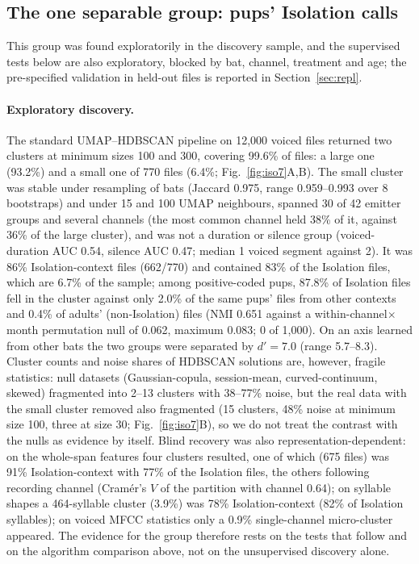 \subsection{The one separable group: pups' Isolation calls}\label{sec:iso}
This group was found exploratorily in the discovery sample, and the supervised tests below are also exploratory, blocked by bat, channel, treatment and age; the pre-specified validation in held-out files is reported in Section~\ref{sec:repl}.

\paragraph{Exploratory discovery.} The standard UMAP--HDBSCAN pipeline on 12,000 voiced files returned two clusters at minimum sizes 100 and 300, covering 99.6\% of files: a large one (93.2\%) and a small one of 770 files (6.4\%; Fig.~\ref{fig:iso7}A,B). The small cluster was stable under resampling of bats (Jaccard 0.975, range 0.959--0.993 over 8 bootstraps) and under 15 and 100 UMAP neighbours, spanned 30 of 42 emitter groups and several channels (the most common channel held 38\% of it, against 36\% of the large cluster), and was not a duration or silence group (voiced-duration AUC 0.54, silence AUC 0.47; median 1 voiced segment against 2). It was 86\% Isolation-context files (662/770) and contained 83\% of the Isolation files, which are 6.7\% of the sample; among positive-coded pups, 87.8\% of Isolation files fell in the cluster against only 2.0\% of the same pups' files from other contexts and 0.4\% of adults' (non-Isolation) files (NMI 0.651 against a within-channel$\times$month permutation null of 0.062, maximum 0.083; 0 of 1,000). On an axis learned from other bats the two groups were separated by $d'=7.0$ (range 5.7--8.3). Cluster counts and noise shares of HDBSCAN solutions are, however, fragile statistics: null datasets (Gaussian-copula, session-mean, curved-continuum, skewed) fragmented into 2--13 clusters with 38--77\% noise, but the real data with the small cluster removed also fragmented (15 clusters, 48\% noise at minimum size 100, three at size 30; Fig.~\ref{fig:iso7}B), so we do not treat the contrast with the nulls as evidence by itself. Blind recovery was also representation-dependent: on the whole-span features four clusters resulted, one of which (675 files) was 91\% Isolation-context with 77\% of the Isolation files, the others following recording channel (Cram\'er's $V$ of the partition with channel 0.64); on syllable shapes a 464-syllable cluster (3.9\%) was 78\% Isolation-context (82\% of Isolation syllables); on voiced MFCC statistics only a 0.9\% single-channel micro-cluster appeared. The evidence for the group therefore rests on the tests that follow and on the algorithm comparison above, not on the unsupervised discovery alone.

